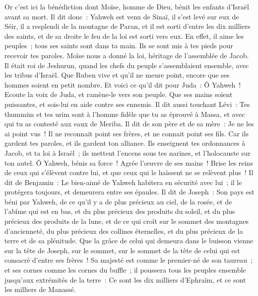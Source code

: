 \begin{multicols}{2}
\VerseOne{}Or c'est ici la bénédiction dont Moïse, homme de Dieu, bénit les enfants d'Israël avant sa mort.
Il dit donc~: Yahweh est venu de Sinaï, il s'est levé sur eux de Séir, il a resplendi de la montagne de Paran, et il est sorti d'entre les dix milliers des saints, et de sa droite le feu de la loi est sorti vers eux.
En effet, il aime les peuples~; tous ses saints sont dans ta main. Ils se sont mis à tes pieds pour recevoir tes paroles.
Moïse nous a donné la loi, héritage de l'assemblée de Jacob.
Il était roi de Jeshurun, quand les chefs du peuple s'assemblaient ensemble, avec les tribus d'Israël.
Que Ruben vive et qu'il ne meure point, encore que ses hommes soient en petit nombre.
Et voici ce qu'il dit pour Juda~: Ô Yahweh~! Ecoute la voix de Juda, et ramène-le vers son peuple. Que ses mains soient puissantes, et sois-lui en aide contre ses ennemis.
Il dit aussi touchant Lévi~: Tes thummim et tes urim sont à l'homme fidèle que tu as éprouvé à Massa, et avec qui tu as contesté aux eaux de Meriba.
Il dit de son père et de sa mère~: Je ne les ai point vus~! Il ne reconnait point ses frères, et ne connait point ses fils. Car ils gardent tes paroles, et ils gardent ton alliance.
Ils enseignent tes ordonnances à Jacob, et ta loi à Israël~; ils mettent l'encens sous tes narines, et l'holocauste sur ton autel.
Ô Yahweh, bénis sa force~! Agrée l'œuvre de ses mains~! Brise les reins de ceux qui s'élèvent contre lui, et que ceux qui le haïssent ne se relèvent plus~!
Il dit de Benjamin~: Le bien-aimé de Yahweh habitera en sécurité avec lui~; il le protégera toujours, et demeurera entre ses épaules.
Il dit de Joseph~: Son pays est béni par Yahweh, de ce qu'il y a de plus précieux au ciel, de la rosée, et de l'abîme qui est en bas,
et du plus précieux des produits du soleil, et du plus précieux des produits de la lune, 
et de ce qui croît sur le sommet des montagnes d'ancienneté, du plus précieux des collines éternelles,
et du plus précieux de la terre et de sa plénitude. Que la grâce de celui qui demeura dans le buisson vienne sur la tête de Joseph, sur le sommet, sur le sommet de la tête de celui qui est consacré d'entre ses frères~!
Sa majesté est comme le premier-né de son taureau~; et ses cornes comme les cornes du buffle~; il poussera tous les peuples ensemble jusqu'aux extrémités de la terre~: Ce sont les dix milliers d'Ephraïm, et ce sont les milliers de Manassé.

\end{multicols}
